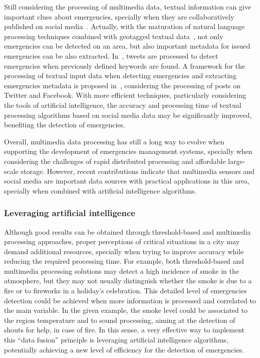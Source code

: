 \begin{refsection}
Still considering the processing of multimedia data, textual information can give important clues about emergencies, specially when they are collaboratively published on social media~\cite{socialmedia5}. Actually, with the maturation of natural language processing techniques combined with geotagged textual data~\cite{naturalLanguage}, not only emergencies can be detected on an area, but also important metadata for issued emergencies can be also extracted. In~\cite{twitterDetection2,socialmedia1,twitterDetection1}, tweets are processed to detect emergencies when previously defined keywords are found. A framework for the processing of textual input data when detecting emergencies and extracting emergencies metadata is proposed in~\cite{twitterDetection3}, considering the processing of posts on Twitter and Facebook. With more efficient techniques, particularly considering the tools of artificial intelligence, the accuracy and processing time of textual processing algorithms based on social media data may be significantly improved, benefiting the detection of emergencies. 

Overall, multimedia data processing has still a long way to evolve when supporting the development of emergencies management systems, specially when considering the challenges of rapid distributed processing and affordable large-scale storage. However, recent contributions indicate that multimedia sensors and social media are important data sources with practical applications in this area, specially when combined with artificial intelligence algorithms. 

\subsubsection{Leveraging artificial intelligence}

Although good results can be obtained through threshold-based and multimedia processing approaches, proper perceptions of critical situations in a city may demand additional resources, specially when trying to improve accuracy while reducing the required processing time. For example, both threshold-based and multimedia processing solutions may detect a high incidence of smoke in the atmosphere, but they may not usually distinguish whether the smoke is due to a fire or to fireworks in a holiday's celebration. This detailed level of emergencies detection could be achieved when more information is processed and correlated to the main variable. In the given example, the smoke level could be associated to the region temperature and to sound processing, aiming at the detection of shouts for help, in case of fire. In this sense, a very effective way to implement this ``data fusion'' principle is leveraging artificial intelligence algorithms, potentially achieving a new level of efficiency for the detection of emergencies. 


\end{refsection}
